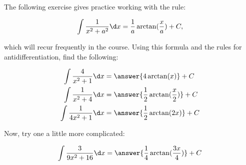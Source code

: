 \documentclass{ximera}
\author{Jim Talamo}
\begin{document}
\begin{exercise}
The following exercise gives practice working with the rule: 

\[\int \frac{1}{x^2+a^2} \d x = \frac{1}{a} \arctan(\frac{x}{a}) +C, \]

which will recur frequently in the course.  Using this formula and the rules for antidifferentiation, find the following:

\begin{align*}
\int \frac{4}{x^2+1} \d x &= \answer{4\arctan(x)}+C\\
\int \frac{1}{x^2+4} \d x &= \answer{\frac{1}{2}\arctan(\frac{x}{2})}+C\\
\int \frac{1}{4x^2+1} \d x &= \answer{\frac{1}{2} \arctan(2x)}+C\\
\end{align*}

Now, try one a little more complicated:

\[ \int \frac{3}{9x^2+16} \d x = \answer{\frac{1}{4}\arctan(\frac{3x}{4})}+C \]

\end{exercise}
\end{document}
